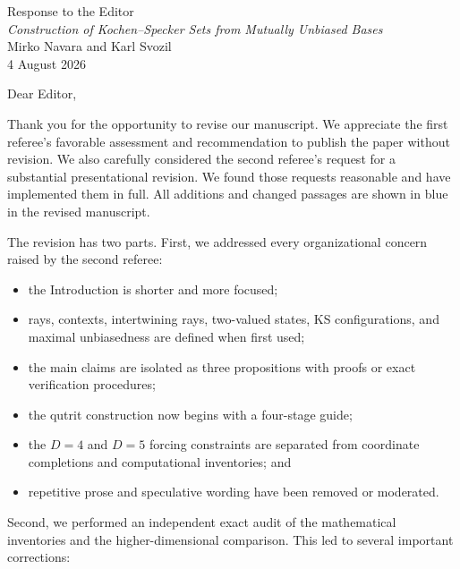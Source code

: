 \documentclass[11pt]{article}
\newcommand{\manuscript}{\textit{Construction of Kochen--Specker Sets from Mutually Unbiased Bases}}
\begin{document}
\begin{center}
{\Large Response to the Editor}\\[0.5em]
\manuscript\\[0.25em]
Mirko Navara and Karl Svozil\\[0.25em]
4 August 2026
\end{center}

Dear Editor,

Thank you for the opportunity to revise our manuscript.  We appreciate the first referee's favorable assessment and recommendation to publish the paper without revision.  We also carefully considered the second referee's request for a substantial presentational revision.  We found those requests reasonable and have implemented them in full.  All additions and changed passages are shown in blue in the revised manuscript.

The revision has two parts.  First, we addressed every organizational concern raised by the second referee:

\begin{itemize}
\item the Introduction is shorter and more focused;
\item rays, contexts, intertwining rays, two-valued states, KS configurations, and maximal unbiasedness are defined when first used;
\item the main claims are isolated as three propositions with proofs or exact verification procedures;
\item the qutrit construction now begins with a four-stage guide;
\item the $D=4$ and $D=5$ forcing constraints are separated from coordinate completions and computational inventories; and
\item repetitive prose and speculative wording have been removed or moderated.
\end{itemize}

Second, we performed an independent exact audit of the mathematical inventories and the higher-dimensional comparison.  This led to several important corrections:
\end{document}
